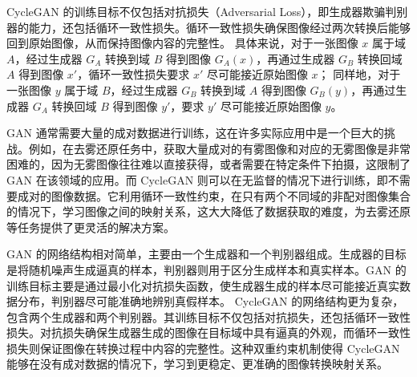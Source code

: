 CycleGAN 的训练目标不仅包括对抗损失（Adversarial Loss），即生成器欺骗判别器的能力，还包括循环一致性损失。循环一致性损失确保图像经过两次转换后能够回到原始图像，从而保持图像内容的完整性。
具体来说，对于一张图像 $x$ 属于域 $A$，经过生成器 $G_A$ 转换到域 $B$ 得到图像 $G_A(x)$，再通过生成器 $G_B$ 转换回域 $A$ 得到图像 $x'$，循环一致性损失要求 $x'$ 尽可能接近原始图像 $x$；
同样地，对于一张图像 $y$ 属于域 $B$，经过生成器 $G_B$ 转换到域 $A$ 得到图像 $G_B(y)$，再通过生成器 $G_A$ 转换回域 $B$ 得到图像 $y'$，要求 $y'$ 尽可能接近原始图像 $y$。


\begin{figure}[htb]
    \centering
    \captionsetup{font=footnotesize}
    \label{fig:cgan}
\end{figure}

GAN 通常需要大量的成对数据进行训练，这在许多实际应用中是一个巨大的挑战。例如，在去雾还原任务中，获取大量成对的有雾图像和对应的无雾图像是非常困难的，因为无雾图像往往难以直接获得，或者需要在特定条件下拍摄，这限制了 GAN 在该领域的应用。而 CycleGAN 则可以在无监督的情况下进行训练，即不需要成对的图像数据。它利用循环一致性约束，在只有两个不同域的非配对图像集合的情况下，学习图像之间的映射关系，这大大降低了数据获取的难度，为去雾还原等任务提供了更灵活的解决方案。

GAN 的网络结构相对简单，主要由一个生成器和一个判别器组成。生成器的目标是将随机噪声生成逼真的样本，判别器则用于区分生成样本和真实样本。GAN 的训练目标主要是通过最小化对抗损失函数，使生成器生成的样本尽可能接近真实数据分布，判别器尽可能准确地辨别真假样本。
CycleGAN 的网络结构更为复杂，包含两个生成器和两个判别器。其训练目标不仅包括对抗损失，还包括循环一致性损失。对抗损失确保生成器生成的图像在目标域中具有逼真的外观，而循环一致性损失则保证图像在转换过程中内容的完整性。这种双重约束机制使得 CycleGAN 能够在没有成对数据的情况下，学习到更稳定、更准确的图像转换映射关系。

